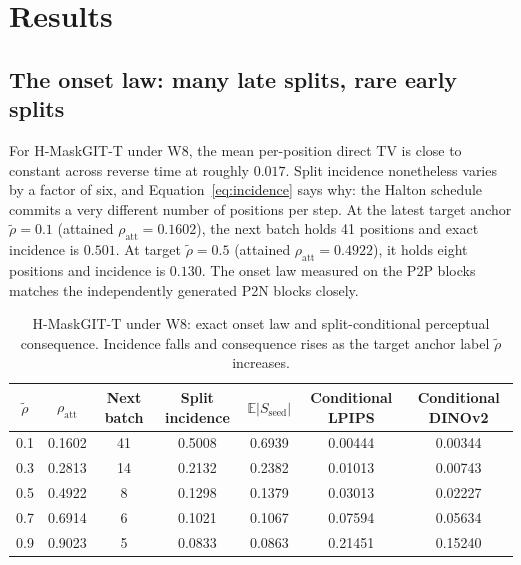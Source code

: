 \documentclass[11pt,a4paper]{article}
\theoremstyle{plain}
\theoremstyle{definition}
\theoremstyle{remark}
\newcommand{\Ex}{\mathbb{E}}
\newcommand{\rholabel}{\widetilde{\rho}}
\newcommand{\rhoatt}{\rho_{\mathrm{att}}}
\begin{document}
\section{Results}
\label{sec:results}

\subsection{The onset law: many late splits, rare early splits}
\label{sec:onset}

For H-MaskGIT-T under W8, the mean per-position direct TV is close to constant
across reverse time at roughly $0.017$. Split incidence nonetheless varies by a
factor of six, and Equation~\eqref{eq:incidence} says why: the Halton schedule
commits a very different number of positions per step. At the latest target anchor $\rholabel=0.1$ (attained $\rhoatt=0.1602$), the
next batch holds 41 positions and exact incidence is $0.501$. At target $\rholabel=0.5$ (attained $\rhoatt=0.4922$), it
holds eight positions and incidence is $0.130$. The onset law measured on the P2P
blocks matches the independently generated P2N blocks closely.

\begin{table}[t]
\centering
\caption{H-MaskGIT-T under W8: exact onset law and split-conditional perceptual
consequence. Incidence falls and consequence rises as the target anchor label $\rholabel$ increases.}
\label{tab:onset}
\small
\begin{tabular}{@{}ccccccc@{}}
\toprule
$\rholabel$ & $\rhoatt$ & Next batch & Split incidence & $\Ex|S_{\mathrm{seed}}|$
& Conditional LPIPS & Conditional DINOv2 \\
\midrule
0.1 & 0.1602 & 41 & 0.5008 & 0.6939 & 0.00444 & 0.00344 \\
0.3 & 0.2813 & 14 & 0.2132 & 0.2382 & 0.01013 & 0.00743 \\
0.5 & 0.4922 &  8 & 0.1298 & 0.1379 & 0.03013 & 0.02227 \\
0.7 & 0.6914 &  6 & 0.1021 & 0.1067 & 0.07594 & 0.05634 \\
0.9 & 0.9023 &  5 & 0.0833 & 0.0863 & 0.21451 & 0.15240 \\
\bottomrule
\end{tabular}
\end{table}
\end{document}
